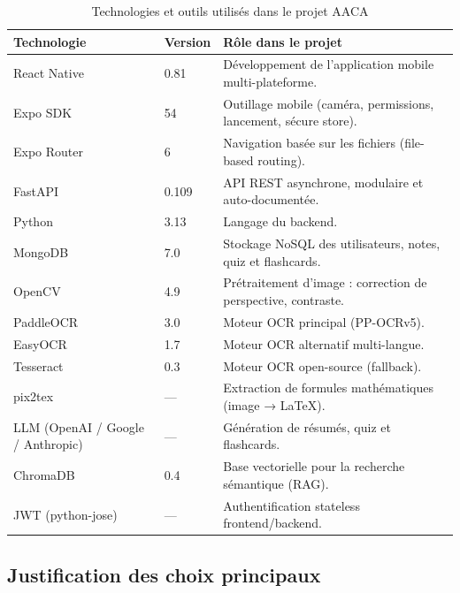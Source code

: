 \documentclass[12pt,a4paper]{report}
\begin{document}
\begin{table}[H]
\centering
\begin{tabularx}{\textwidth}{|p{3.8cm}|p{2.5cm}|X|}
\hline
\textbf{Technologie} & \textbf{Version} & \textbf{Rôle dans le projet}\\
\hline
React Native & 0.81 & Développement de l'application mobile multi-plateforme.\\
\hline
Expo SDK & 54 & Outillage mobile (caméra, permissions, lancement, sécure store).\\
\hline
Expo Router & 6 & Navigation basée sur les fichiers (file-based routing).\\
\hline
FastAPI & 0.109 & API REST asynchrone, modulaire et auto-documentée.\\
\hline
Python & 3.13 & Langage du backend.\\
\hline
MongoDB & 7.0 & Stockage NoSQL des utilisateurs, notes, quiz et flashcards.\\
\hline
OpenCV & 4.9 & Prétraitement d'image : correction de perspective, contraste.\\
\hline
PaddleOCR & 3.0 & Moteur OCR principal (PP-OCRv5).\\
\hline
EasyOCR & 1.7 & Moteur OCR alternatif multi-langue.\\
\hline
Tesseract & 0.3 & Moteur OCR open-source (fallback).\\
\hline
pix2tex & --- & Extraction de formules mathématiques (image → LaTeX).\\
\hline
LLM (OpenAI / Google / Anthropic) & --- & Génération de résumés, quiz et flashcards.\\
\hline
ChromaDB & 0.4 & Base vectorielle pour la recherche sémantique (RAG).\\
\hline
JWT (python-jose) & --- & Authentification stateless frontend/backend.\\
\hline
\end{tabularx}
\caption{Technologies et outils utilisés dans le projet AACA}
\label{tab:technologies}
\end{table}

\subsection{Justification des choix principaux}
\end{document}
